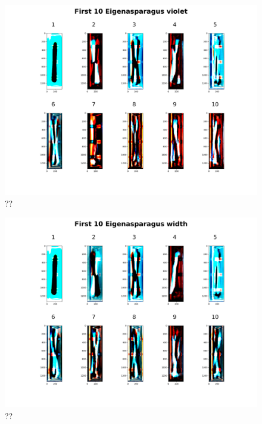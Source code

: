 \begin{figure}[H]
	\centering
	\includegraphics[scale=0.09]{Figures/chapter04/pc_violet}
	\decoRule
	\caption[??]{??}
	\label{fig:PrincipalComponentViolet}
\end{figure}


\begin{figure}[H]
	\centering
	\includegraphics[scale=0.09]{Figures/chapter04/pc_width}
	\decoRule
	\caption[??]{??}
	\label{fig:PrincipalComponentWidth}
\end{figure}


